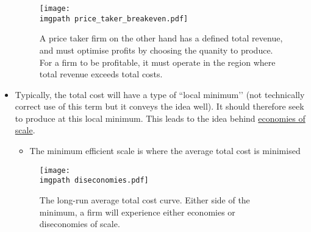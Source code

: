 \documentclass[../notes_compiled.tex]{subfiles}
\begin{document}
\begin{itemize}
\begin{figure}[h]
  \centering
  \texttt{[image: \\imgpath price\_taker\_breakeven.pdf]}
  \caption{A price taker firm on the other hand has a defined total revenue, and must optimise profits by choosing the quanity to produce. For a firm to be profitable, it must operate in the region where total revenue exceeds total costs.}
\end{figure}

\item Typically, the total cost will have a type of ``local minimum’’ (not technically correct use of this term but it conveys the idea well). It should therefore seek to produce at this local minimum. This leads to the idea behind \underline{economies of scale}.

\begin{itemize}
\item The minimum efficient scale is where the average total cost is minimised
\end{itemize}
\begin{figure}[h]
  \centering
  \texttt{[image: \\imgpath diseconomies.pdf]}
  \caption{The long-run average total cost curve. Either side of the minimum, a firm will experience either economies or diseconomies of scale.}
\end{figure}
\end{itemize}
\end{document}

